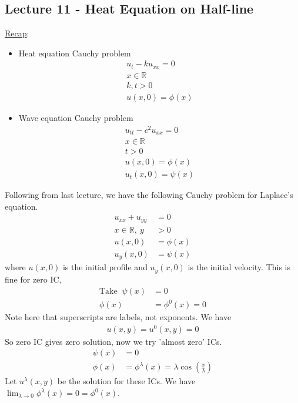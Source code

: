 \documentclass[12pt, letterpaper]{article}
\begin{document}
\subsection{Lecture 11 - Heat Equation on Half-line}
\underline{Recap}:
\begin{itemize}
    \item Heat equation Cauchy problem
    \begin{align*}
        u_t - ku_{xx} = 0 \\
        x \in \mathbb{R} \\
        k, t > 0 \\
        u(x,0) = \phi(x)
    \end{align*}
    \item Wave equation Cauchy problem 
    \begin{align*}
        u_{tt} - c^2u_{xx} = 0 \\
        x \in \mathbb{R} \\
        t > 0 \\
        u(x,0) = \phi(x) \\
        u_t(x,0) = \psi(x)
    \end{align*}
\end{itemize}
Following from last lecture, we have the following Cauchy problem for Laplace's equation.
\begin{align*}
    u_{xx} + u_{yy} &= 0\\
    x\in \mathbb{R},\ y &> 0\\
    u(x,0) &= \phi(x) \\
    u_y(x,0) &= \psi(x)
\end{align*}
where $u(x,0)$ is the initial profile and $u_y(x,0)$ is the 
initial velocity. This is fine for zero IC,
\begin{align*}
    \text{Take }\ \psi(x) &= 0 \\
    \phi(x) &= \phi^0(x) = 0
\end{align*}
Note here that superscripts are labels, not exponents. We have 
\begin{align*}
    u(x,y) = u^0(x,y) = 0
\end{align*}
So zero IC gives zero solution, now we try 'almost zero' ICs.
\begin{align*}
    \psi(x) &= 0\\
    \phi(x) &= \phi^\lambda(x) = \lambda\cos(\frac x\lambda)
\end{align*}
Let $u^\lambda(x,y)$ be the solution for these ICs. We have $\lim_{\lambda \rightarrow 0} \phi^\lambda(x) = 0 = \phi^0(x)$.
\end{document}
